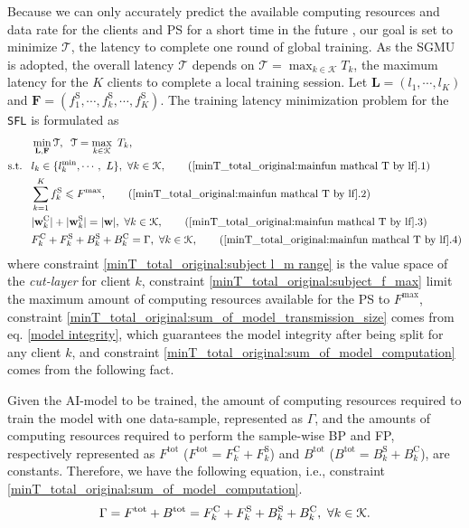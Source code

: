 \documentclass[10pt,journal,transmag]{IEEEtran}
\begin{document}
Because we can only accurately predict the available computing resources and data rate for the clients and PS for a short time in the future \cite{9778210}, our goal is set to minimize $\mathcal{T}$, the latency to complete one round of global training. As the SGMU is adopted, the overall latency $\mathcal{T}$ depends on $\mathcal{T}=\max_{k\in\mathcal{K}}T_k$, the maximum latency for the $K$ clients to complete a local training session. Let $\textbf{L} = (l_1, \cdots, l_K)$ and $\textbf{F} = (f^\text{S}_1, \cdots, f^\text{S}_k, \cdots, f^\text{S}_K)$. The training latency minimization problem for the \texttt{SFL} is formulated as
\begin{align}
    & \min_{\textbf{L},\textbf{F}} \mathcal{T}, \; \;  \mathcal{T}=\max_{k\in\mathcal{K}}\ T_k,  \label{minT_total_original:mainfun mathcal T by lf} \\
    \mbox{s.t.}\;\;\;
    & l_k \in \{ l_k^\text{min}, \cdots, \ L\},\ \forall k \in \mathcal{K}, \tag{\ref{minT_total_original:mainfun mathcal T by lf}.1} \label{minT_total_original:subject l_m range} \\
    & \sum^{K}_{k=1} f^\text{S}_k \leqslant F^{\text{max}},  \tag{\ref{minT_total_original:mainfun mathcal T by lf}.2} \label{minT_total_original:subject_f_max} \\
    & |\textbf{w}^\text{C}_k| + |\textbf{w}^\text{S}_k| = |\textbf{w}|,\ \forall k \in \mathcal{K}, \tag{\ref{minT_total_original:mainfun mathcal T by lf}.3} \label{minT_total_original:sum_of_model_transmission_size} \\
    & F^\text{C}_k + F^\text{S}_k + B^\text{S}_k + B^\text{C}_k = \Gamma,\ \forall k \in \mathcal{K}, \tag{\ref{minT_total_original:mainfun mathcal T by lf}.4} \label{minT_total_original:sum_of_model_computation}
\end{align} where constraint \eqref{minT_total_original:subject l_m range} is the value space of the \textit{cut-layer} for client $k$,
constraint \eqref{minT_total_original:subject_f_max} limit the maximum amount of computing resources available for the PS to $F^{\text{max}}$,
constraint \eqref{minT_total_original:sum_of_model_transmission_size} comes from eq. \eqref{model integrity}, which guarantees the model integrity after being split for any client $k$, and constraint \eqref{minT_total_original:sum_of_model_computation} comes from the following fact.

Given the AI-model to be trained, the amount of computing resources required to train the model with one data-sample, represented as $\Gamma$, and the amounts of computing resources required to perform the sample-wise BP and FP, respectively represented as $F^\text{tot}$ ($F^\text{tot} = F^\text{C}_k + F^\text{S}_k$) and $B^\text{tot}$ ($B^\text{tot}= B^\text{S}_k + B^\text{C}_k$), are constants. Therefore, we have the following equation, i.e., constraint \eqref{minT_total_original:sum_of_model_computation}. 
\begin{equation}
    \Gamma = F^\text{tot} +B^\text{tot}=F^\text{C}_k + F^\text{S}_k + B^\text{S}_k + B^\text{C}_k,\ \forall k \in \mathcal{K}. \label{min_T:sum_of_model_computation} \\
\end{equation} 
\end{document}
